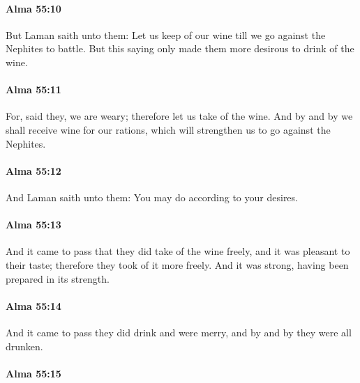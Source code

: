 		\paragraph{Alma 55:10} %
			\label{ALMA-55-10}

			But Laman saith unto them:
			Let us keep of our wine till we go against the Nephites to battle.
			But this saying only made them more desirous to drink of the wine.

		\paragraph{Alma 55:11} %
			\label{ALMA-55-11}

			For, said they, we are weary;
			therefore let us take of the wine.
			And by and by we shall receive wine for our rations,
			which will strengthen us to go against the Nephites.

		\paragraph{Alma 55:12} %
			\label{ALMA-55-12}

			And Laman saith unto them:
			You may do according to your desires.

		\paragraph{Alma 55:13} %
			\label{ALMA-55-13}

			And it came to pass that they did take of the wine freely,
			and it was pleasant to their taste;
			therefore they took of it more freely.
			And it was strong, having been prepared in its strength.

		\paragraph{Alma 55:14} %
			\label{ALMA-55-14}

			And it came to pass they did drink and were merry,
			and by and by they were all drunken.

		\paragraph{Alma 55:15} %
			\label{ALMA-55-15}

